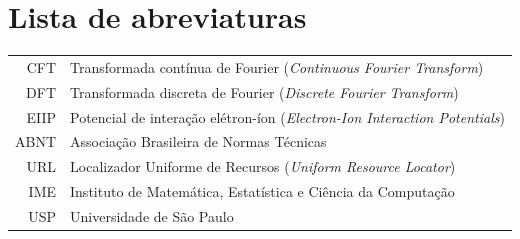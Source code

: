 \documentclass[a4paper,12pt,twoside,english,brazilian]{book}
\begin{document}

\newcommand\disablenewpage[1]{{\let\clearpage\par\let\cleardoublepage\par #1}}

\bgroup
\raggedbottom


\disablenewpage{\chapter*{Lista de abreviaturas}}

\begin{tabular}{rl}
   CFT & Transformada contínua de Fourier (\emph{Continuous Fourier Transform})\\
   DFT & Transformada discreta de Fourier (\emph{Discrete Fourier Transform})\\
  EIIP & Potencial de interação elétron-íon (\emph{Electron-Ion Interaction Potentials})\\
  ABNT & Associação Brasileira de Normas Técnicas\\
   URL & Localizador Uniforme de Recursos (\emph{Uniform Resource Locator})\\
   IME & Instituto de Matemática, Estatística e Ciência da Computação\\
   USP & Universidade de São Paulo
\end{tabular}
\end{document}
